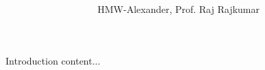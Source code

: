 \documentclass[10pt]{beamer}
\title[(\pptShortTitle)]{\textbf{\pptTitle}}
\subtitle{\pptSubTitle}
\author{HMW-Alexander, Prof. Raj Rajkumar}
\institute{CMU-ECE}
\begin{document}
	\frame[plain]{\maketitle}
	\begin{frame}{Introduction}
		content...
	\end{frame}
\end{document}
